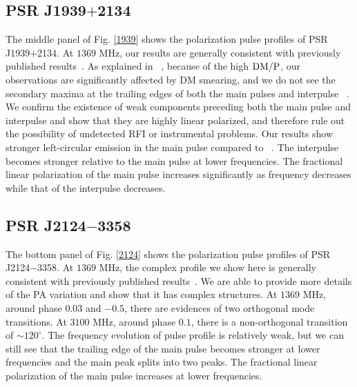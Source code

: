 \documentclass[useAMS,usenatbib]{mn2e}
\begin{document}
\begin{appendices}
\subsection{PSR J1939$+$2134}

The middle panel of Fig. \ref{1939} shows the polarization pulse profiles of 
PSR J1939$+$2134.
%
At $1369$ MHz, our results are generally consistent with previously published 
results~\citep{Yan11}.
%
As explained in ~\citet{Yan11}, because of the high $\rm{DM}/P$, our observations 
are significantly affected by DM smearing, and we do not see the secondary 
maxima at the trailing edges of both the main pulses and interpulse
~\citep{Thorsett90,Stairs99,Ord04}.
%
We confirm the existence of weak components preceding both the main pulse 
and interpulse and show that they are highly linear polarized, and therefore 
rule out the possibility of undetected RFI or instrumental problems.
%
Our results show stronger left-circular emission in the main pulse compared 
to ~\citet{Yan11}.
%
The interpulse becomes stronger relative to the main pulse at lower frequencies.
%
The fractional linear polarization of the main pulse increases significantly 
as frequency decreases while that of the interpulse decreases.



\subsection{PSR J2124$-$3358}

The bottom panel of Fig. \ref{2124} shows the polarization pulse profiles of 
PSR J2124$-$3358.
%
At $1369$ MHz, the complex profile we show here is generally consistent with 
previously published results~\citep{Yan11}.
%
We are able to provide more details of the PA variation and show that it has 
complex structures.
%
At $1369$ MHz, around phase $0.03$ and $-0.5$, there are evidences of two 
orthogonal mode transitions.
%
At $3100$ MHz, around phase $0.1$, there is a non-orthogonal transition of 
$\sim120^{\circ}$.
%
The frequency evolution of pulse profile is relatively weak, but we can 
still see that the trailing edge of the main pulse becomes stronger at 
lower frequencies and the main peak splits into two peaks.
%
The fractional linear polarization of the main pulse increases at lower 
frequencies.


\end{appendices}
\end{document}

